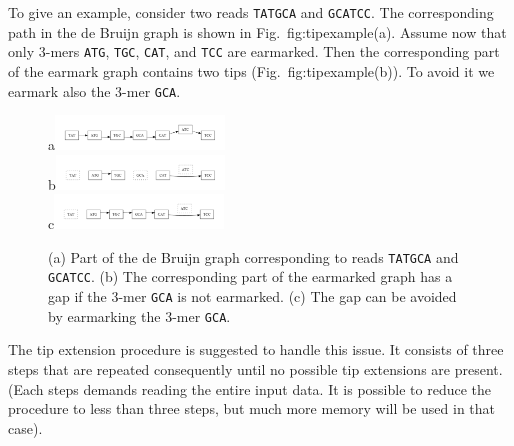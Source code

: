 \documentclass[17pt]{extarticle}
\theoremstyle{definition}
\begin{document}
\begin{multicols}{2}
To give an example,
consider two reads {\tt TATGCA} and {\tt GCATCC}.
The corresponding path in the de Bruijn graph is shown in 
Fig.~{fig:tipexample}(a). Assume now that only $3$-mers
{\tt ATG}, {\tt TGC}, {\tt CAT}, and {\tt TCC} are earmarked.
Then the corresponding part of the earmark graph contains two tips 
(Fig.~{fig:tipexample}(b)). To avoid it we earmark also the $3$-mer
{\tt GCA}.

\begin{figure}
\caption{(a) Part of the de Bruijn graph corresponding to reads 
{\tt TATGCA} and {\tt GCATCC}. (b) The corresponding part 
of the earmarked graph has a gap if the $3$-mer {\tt GCA} is not 
earmarked. (c) The gap can be avoided by earmarking the $3$-mer 
{\tt GCA}.}\label{fig:tipexample}
\begin{center}
a\includegraphics[width=0.4\textwidth]{fig5_de.pdf}\\
b\includegraphics[width=0.4\textwidth]{fig5_ear.pdf}\\
c\includegraphics[width=0.4\textwidth]{fig5_earwotip.pdf}\\
\end{center}
\end{figure}


The tip extension procedure is suggested to handle this issue.
It consists of three steps that are repeated consequently until 
no possible tip extensions are present.
(Each steps demands reading the entire input data. It is possible to reduce the procedure to less than three
steps, but much more memory will be used in that case).


\end{multicols}
\end{document}
